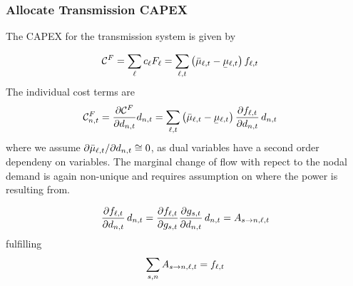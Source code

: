 \documentclass[a4paper,10pt]{article}
\begin{document}
\subsubsection*{Allocate Transmission CAPEX}


The CAPEX for the transmission system is given by 

\begin{align}
 \totalCapexFlow & = \sum_\ell \capexFlow \capacityFlow = \sum_{\ell,t} \left( \muupperflow - \mulowerflow \right)  \flow 
\end{align}
% 
The individual cost terms are 
\begin{align}
\allocateCapexFlow = \pdv{\totalCapexFlow}{\demand}\demand & =  \sum_{\ell,t} \left( \muupperflow - \mulowerflow \right) \pdv{\flow}{\demand} \, \demand
\end{align}
where we assume $\partial \bar{\mu}_{\ell,t}/\partial d_{n,t} \cong 0 $, as dual variables have a second order dependeny on variables. The marginal change of flow with repect to the nodal demand is again non-unique and requires assumption on where the power is resulting from. 

\begin{align}
 \dfrac{\partial f_{\ell,t}}{\partial d_{n,t}}\, d_{n,t} = \dfrac{\partial f_{\ell,t}}{\partial g_{s,t}} \dfrac{\partial g_{s,t}}{\partial d_{n,t}} \, d_{n,t}  = A_{s \rightarrow n,\ell,t}
\end{align}
fulfilling 
\begin{align}
\sum_{s,n} A_{s \rightarrow n,\ell,t} = f_{\ell,t} 
\end{align}




 
\end{document}
